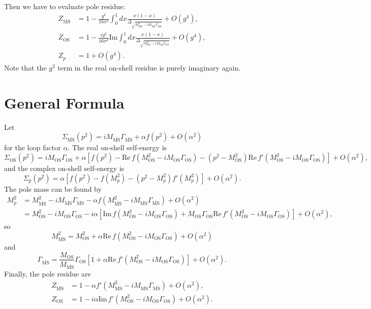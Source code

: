 \documentclass[11pt]{article}
\theoremstyle{definition}
\theoremstyle{remark}
\begin{document}
	Then we have to evaluate pole residue:
	\begin{align*}
		Z_{\overline{\mathrm{MS}}}&=1-\frac{g^{2}}{16\pi^{2}}\int_{0}^{1}dx\frac{x(1-x)}{\Delta_{\sqrt{M_{\overline{\mathrm{MS}}}^{2}-iM_{\overline{\mathrm{MS}}}\Gamma_{\overline{\mathrm{MS}}}}}}+O(g^{4}),\\
		Z_{\mathrm{OS}}&=1-\frac{ig^{2}}{16\pi^{2}}\mathrm{Im}\int_{0}^{1}dx\frac{x(1-x)}{\Delta_{\sqrt{M_{\mathrm{OS}}^{2}-iM_{\mathrm{OS}}\Gamma_{\mathrm{OS}}}}}+O(g^{4}),\\
		Z_{p}&=1+O(g^{4}).
	\end{align*}
	Note that the $g^{2}$ term in the real on-shell residue is purely imaginary again.
	
	\section{General Formula}
	Let
	\[\Sigma_{\overline{\mathrm{MS}}}(p^{2})=iM_{\overline{\mathrm{MS}}}\Gamma_{\overline{\mathrm{MS}}}+\alpha f(p^{2})+O(\alpha^{2})\]
	for the loop factor $\alpha$.
	The real on-shell self-energy is
	\[\Sigma_{\mathrm{OS}}(p^{2})=iM_{\mathrm{OS}}\Gamma_{\mathrm{OS}}+\alpha\left[f(p^{2})-\mathrm{Re}\,f(M_{\mathrm{OS}}^{2}-iM_{\mathrm{OS}}\Gamma_{\mathrm{OS}})-(p^{2}-M_{\mathrm{OS}}^{2})\mathrm{Re}\,f'(M_{\mathrm{OS}}^{2}-iM_{\mathrm{OS}}\Gamma_{\mathrm{OS}})\right]+O(\alpha^{2}),\]
	and the complex on-shell self-energy is
	\[\Sigma_{p}(p^{2})=\alpha\left[f(p^{2})-f(M_{p}^{2})-(p^{2}-M_{p}^{2})f'(M_{p}^{2})\right]+O(\alpha^{2}).\]
	The pole mass can be found by
	\begin{align*}
		M_{p}^{2}&=M_{\overline{\mathrm{MS}}}^{2}-iM_{\overline{\mathrm{MS}}}\Gamma_{\overline{\mathrm{MS}}}-\alpha f(M_{\overline{\mathrm{MS}}}^{2}-iM_{\overline{\mathrm{MS}}}\Gamma_{\overline{\mathrm{MS}}})+O(\alpha^{2})\\
		&=M_{\mathrm{OS}}^{2}-iM_{\mathrm{OS}}\Gamma_{\mathrm{OS}}-i\alpha\left[\mathrm{Im}\,f(M_{\mathrm{OS}}^{2}-iM_{\mathrm{OS}}\Gamma_{\mathrm{OS}})+M_{\mathrm{OS}}\Gamma_{\mathrm{OS}}\mathrm{Re}\,f'(M_{\mathrm{OS}}^{2}-iM_{\mathrm{OS}}\Gamma_{\mathrm{OS}})\right]+O(\alpha^{2}),
	\end{align*}
	so
	\[M_{\overline{\mathrm{MS}}}^{2}=M_{\mathrm{OS}}^{2}+\alpha\mathrm{Re}\,f(M_{\mathrm{OS}}^{2}-iM_{\mathrm{OS}}\Gamma_{\mathrm{OS}})+O(\alpha^{2})\]
	and
	\[\Gamma_{\overline{\mathrm{MS}}}=\frac{M_{\mathrm{OS}}}{M_{\overline{\mathrm{MS}}}}\Gamma_{\mathrm{OS}}\left[1+\alpha\mathrm{Re}\,f'(M_{\mathrm{OS}}^{2}-iM_{\mathrm{OS}}\Gamma_{\mathrm{OS}})\right]+O(\alpha^{2}).\]
	Finally, the pole residue are
	\begin{align*}
		Z_{\overline{\mathrm{MS}}}&=1-\alpha f'(M_{\overline{\mathrm{MS}}}^{2}-iM_{\overline{\mathrm{MS}}}\Gamma_{\overline{\mathrm{MS}}})+O(\alpha^{2}),\\
		Z_{\mathrm{OS}}&=1-i\alpha\mathrm{Im}\,f'(M_{\mathrm{OS}}^{2}-iM_{\mathrm{OS}}\Gamma_{\mathrm{OS}})+O(\alpha^{2}).
	\end{align*}
\end{document}
